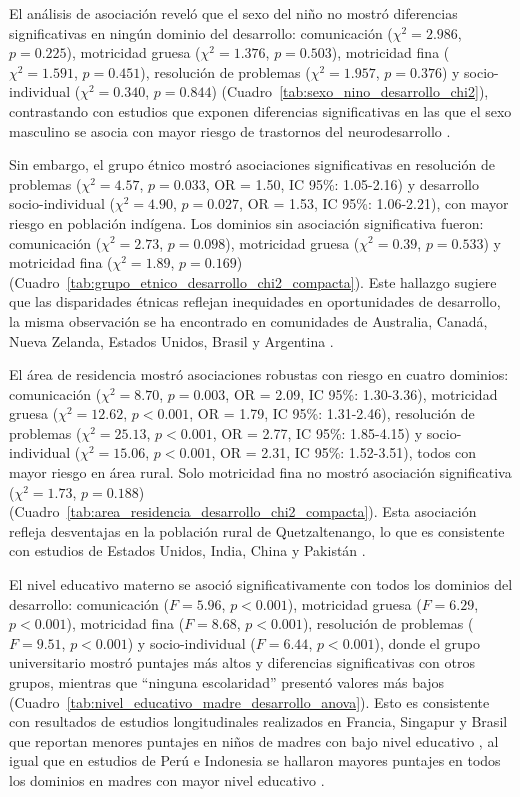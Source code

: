 El análisis de asociación reveló que el sexo del niño no mostró diferencias 
significativas en ningún dominio del desarrollo: comunicación 
($\chi^2 = 2.986$, $p = 0.225$), motricidad gruesa ($\chi^2 = 1.376$, 
$p = 0.503$), motricidad fina ($\chi^2 = 1.591$, $p = 0.451$), resolución 
de problemas ($\chi^2 = 1.957$, $p = 0.376$) y socio-individual 
($\chi^2 = 0.340$, $p = 0.844$) (Cuadro~\ref{tab:sexo_nino_desarrollo_chi2}), 
contrastando con estudios que exponen diferencias significativas en las que
el sexo masculino se asocia con mayor riesgo de trastornos del neurodesarrollo \cite{Sudry2024,Christensen2025,Peyre2019,Nishimura2016}.

Sin embargo, el grupo étnico mostró asociaciones significativas en resolución 
de problemas ($\chi^2 = 4.57$, $p = 0.033$, OR = 1.50, IC 95\%: 1.05-2.16) 
y desarrollo socio-individual ($\chi^2 = 4.90$, $p = 0.027$, OR = 1.53, 
IC 95\%: 1.06-2.21), con mayor riesgo en población indígena. Los dominios sin 
asociación significativa fueron: comunicación ($\chi^2 = 2.73$, $p = 0.098$), 
motricidad gruesa ($\chi^2 = 0.39$, $p = 0.533$) y motricidad fina 
($\chi^2 = 1.89$, $p = 0.169$) 
(Cuadro~\ref{tab:grupo_etnico_desarrollo_chi2_compacta}). Este hallazgo 
sugiere que las disparidades étnicas reflejan inequidades en oportunidades de
desarrollo, la misma observación se ha encontrado en comunidades de Australia,
Canadá, Nueva Zelanda, Estados Unidos, Brasil y Argentina
\cite{Lau2022,Hanly2020,Wehby2017}.

El área de residencia mostró asociaciones robustas con riesgo en cuatro
dominios: comunicación ($\chi^2 = 8.70$, $p = 0.003$, OR = 2.09, 
IC 95\%: 1.30-3.36), motricidad gruesa ($\chi^2 = 12.62$, $p < 0.001$, 
OR = 1.79, IC 95\%: 1.31-2.46), resolución de problemas ($\chi^2 = 25.13$, 
$p < 0.001$, OR = 2.77, IC 95\%: 1.85-4.15) y socio-individual 
($\chi^2 = 15.06$, $p < 0.001$, OR = 2.31, IC 95\%: 1.52-3.51), todos con 
mayor riesgo en área rural. Solo motricidad fina no mostró asociación 
significativa ($\chi^2 = 1.73$, $p = 0.188$) 
(Cuadro~\ref{tab:area_residencia_desarrollo_chi2_compacta}). Esta asociación
refleja desventajas en la población rural de Quetzaltenango, lo que es
consistente con estudios de Estados Unidos, India, China y Pakistán
\cite{Zablotsky2020-tb,Chatterjee2020,Murthy2020,Wang2020,Avan2010}.

El nivel educativo materno se asoció significativamente con todos los dominios 
del desarrollo: comunicación ($F = 5.96$, $p < 0.001$), motricidad gruesa 
($F = 6.29$, $p < 0.001$), motricidad fina ($F = 8.68$, $p < 0.001$), 
resolución de problemas ($F = 9.51$, $p < 0.001$) y socio-individual 
($F = 6.44$, $p < 0.001$), donde el grupo universitario mostró puntajes más 
altos y diferencias significativas con otros grupos, mientras que ``ninguna 
escolaridad'' presentó valores más bajos 
(Cuadro~\ref{tab:nivel_educativo_madre_desarrollo_anova}). Esto es consistente
con resultados de estudios longitudinales realizados en Francia, Singapur y
Brasil que reportan menores puntajes en niños de madres con bajo nivel educativo
\cite{Charkaluk2024,Lockhart2023,Yeleswarapu2025,Munhoz2022}, al igual que en
estudios de Perú e Indonesia se hallaron mayores puntajes en todos los dominios
en madres con mayor nivel educativo \cite{Handal2007,Hanifah2022}.

